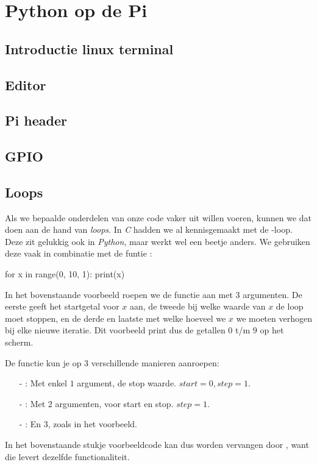 \chapter{Python op de Pi}

\section{Introductie linux terminal}

\section{Editor}

\section{Pi header}

\section{GPIO}

\section{Loops}
Als we bepaalde onderdelen van onze code vaker uit willen voeren, kunnen we dat doen aan de hand van \textit{loops}. In \textit{C} hadden we al kennisgemaakt met de -loop. Deze zit gelukkig ook in \textit{Python}, maar werkt wel een beetje anders. We gebruiken deze vaak in combinatie met de funtie :
\begin{python}
for x in range(0, 10, 1):
	print(x)
\end{python}
In het bovenstaande voorbeeld roepen we de functie  aan met 3 argumenten. De eerste geeft het startgetal voor $x$ aan, de tweede bij welke waarde van $x$ de loop moet stoppen, en de derde en laatste met welke hoeveel we $x$ we moeten verhogen bij elke nieuwe iteratie. Dit voorbeeld print dus de getallen $0$ t/m $9$ op het scherm. 

\begin{remark}
De functie  kun je op $3$ verschillende manieren aanroepen:
\begin{enumerate}
\item[-] : Met enkel $1$ argument, de stop waarde. $start=0, step=1$.
\item[-] : Met $2$ argumenten, voor start en stop. $step=1$.
\item[-] : En $3$, zoals in het voorbeeld.
\end{enumerate}
In het bovenstaande stukje voorbeeldcode kan dus  worden vervangen door , want die levert dezelfde functionaliteit.
\end{remark}

